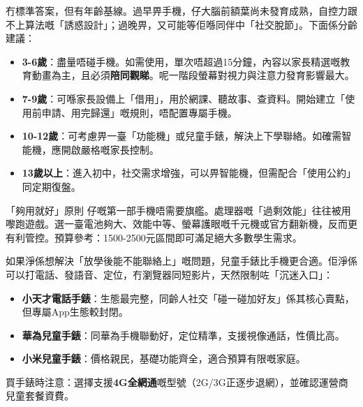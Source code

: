 


冇標準答案，但有年齡基線。過早畀手機，仔大腦前額葉尚未發育成熟，自控力跟不上算法嘅「誘惑設計」；過晚畀，又可能等佢喺同伴中「社交脫節」。下面係分齡建議：

\begin{itemize}
  \item \textbf{3-6歲}：盡量唔碰手機。如需使用，單次唔超過15分鐘，內容以家長精選嘅教育動畫為主，且必須\textbf{陪同觀睇}。呢一階段螢幕對視力與注意力發育影響最大。
  \item \textbf{7-9歲}：可喺家長設備上「借用」，用於網課、聽故事、查資料。開始建立「使用前申請、用完歸還」嘅規則，唔配置專屬手機。
  \item \textbf{10-12歲}：可考慮畀一臺「功能機」或兒童手錶，解決上下學聯絡。如確需智能機，應開啟嚴格嘅家長控制。
  \item \textbf{13歲以上}：進入初中，社交需求增強，可以畀智能機，但需配合「使用公約」同定期復盤。
\end{itemize}

\begin{tcbinfo}{「夠用就好」原則}
仔嘅第一部手機唔需要旗艦。處理器嘅「過剩效能」往往被用嚟跑遊戲。選一臺電池夠大、效能中等、螢幕護眼嘅千元機或官方翻新機，反而更有利管控。預算參考：1500-2500元區間即可滿足絕大多數學生需求。

\end{tcbinfo}


如果淨係想解決「放學後能不能聯絡上」嘅問題，兒童手錶比手機更合適。佢淨係可以打電話、發語音、定位，冇瀏覽器同短影片，天然限制咗「沉迷入口」：

\begin{itemize}
  \item \textbf{小天才電話手錶}：生態最完整，同齡人社交「碰一碰加好友」係其核心賣點，但專屬App生態較封閉。
  \item \textbf{華為兒童手錶}：同華為手機聯動好，定位精準，支援視像通話，性價比高。
  \item \textbf{小米兒童手錶}：價格親民，基礎功能齊全，適合預算有限嘅家庭。
\end{itemize}

買手錶時注意：選擇支援\textbf{4G全網通}嘅型號（2G/3G正逐步退網），並確認運營商兒童套餐資費。

